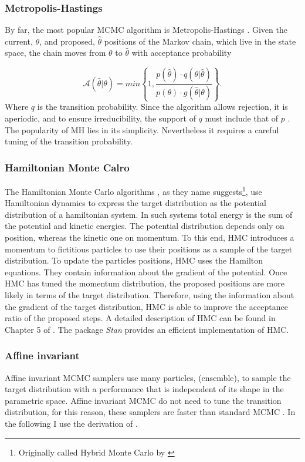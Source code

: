 \subsubsection{Metropolis-Hastings}
By far, the most popular MCMC algorithm is Metropolis-Hastings \citep{Metropolis1953,Hastings1970}. Given the current, $\theta$, and proposed, $\hat{\theta}$ positions of the Markov chain, which live in the state space, the chain moves from $\theta$ to $\hat{\theta}$ with acceptance probability

\begin{equation}
\mathcal{A}(\hat{\theta}|\theta)=min\left\{1,\frac{p(\hat{\theta})\cdot q(\theta|\hat{\theta})}{p(\theta)\cdot g(\hat{\theta}|\theta)}\right\}.
\end{equation}
Where $q$ is the transition probability. Since the algorithm allows rejection, it is aperiodic, and to ensure irreducibility, the support of $q$ must include that of $p$ \citep{Andrieu2003}. The popularity of MH lies in its simplicity. Nevertheless it requires a careful tuning of the transition probability. 

\subsubsection{Hamiltonian Monte Calro}
The Hamiltonian Monte Carlo algorithms \citep{Duane1987,Neal1996}, as they name suggests\footnote{Originally called Hybrid Monte Carlo by \citep{Duane1987}}, use Hamiltonian dynamics to express the target distribution as the potential distribution of a hamiltonian system. In such systems total energy is the sum of the potential and kinetic energies. The potential distribution depends only on position, whereas the kinetic one on momentum. To this end, HMC introduces a momentum to fictitious particles to use their positions as a sample of the target distribution. To update the particles positions, HMC uses the Hamilton equations. They contain information about the gradient of the potential. Once HMC has tuned the momentum distribution, the proposed positions are more likely in terms of the target distribution. Therefore, using the information about the gradient of the target distribution, HMC is able to improve the acceptance ratio of the proposed steps. A detailed description of HMC can be found in Chapter 5 of \citet{Brooks2011}. The package \emph{Stan} \citep{Stan} provides an efficient implementation of HMC.

\subsubsection{Affine invariant}
Affine invariant MCMC samplers use many particles, (ensemble), to sample the target distribution with a performance that is independent of its shape in the parametric space. Affine invariant MCMC do not need to tune the transition distribution, for this reason, these samplers are faster than standard MCMC \citep{Goodman2010}. In the following I use the derivation of \citet{Goodman2010}.


